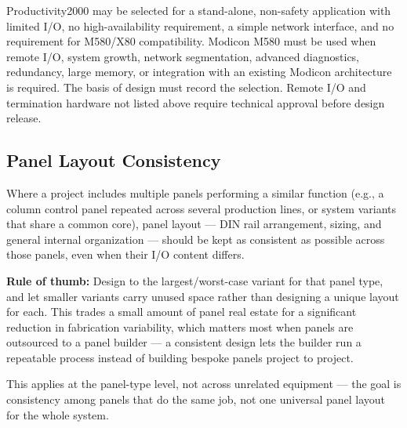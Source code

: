 Productivity2000 may be selected for a stand-alone, non-safety application with limited I/O, no high-availability requirement, a simple network interface, and no requirement for M580/X80 compatibility. Modicon M580 must be used when remote I/O, system growth, network segmentation, advanced diagnostics, redundancy, large memory, or integration with an existing Modicon architecture is required. The basis of design must record the selection. Remote I/O and termination hardware not listed above require technical approval before design release.

\subsection{Panel Layout Consistency}
Where a project includes multiple panels performing a similar function (e.g., a column control panel repeated across several production lines, or system variants that share a common core), panel layout --- DIN rail arrangement, sizing, and general internal organization --- should be kept as consistent as possible across those panels, even when their I/O content differs.

\textbf{Rule of thumb:} Design to the largest/worst-case variant for that panel type, and let smaller variants carry unused space rather than designing a unique layout for each. This trades a small amount of panel real estate for a significant reduction in fabrication variability, which matters most when panels are outsourced to a panel builder --- a consistent design lets the builder run a repeatable process instead of building bespoke panels project to project.

This applies at the panel-type level, not across unrelated equipment --- the goal is consistency among panels that do the same job, not one universal panel layout for the whole system.


